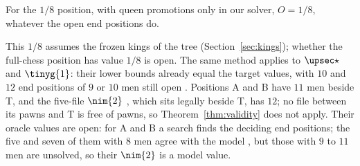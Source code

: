 \begin{proposition}\label{prop:eighth-real}
For the $1/8$ position, with queen promotions only in our solver, $O=1/8$, whatever the open end positions do.
\end{proposition}

This $1/8$ assumes the frozen kings of the tree (Section~\ref{sec:kings}); whether the full-chess position
has value $1/8$ is open. The same method applies to $\upsec\star$ and $\tinyg{1}$: their lower bounds already equal the
target values, with $10$ and $12$ end positions of $9$ or $10$ men still open . Positions A and B have $11$ men beside
T, and the five-file $\nim{2}$ , which sits legally
beside T, has $12$; no file between its pawns and T is free of pawns, so Theorem~\ref{thm:validity} does not apply. Their oracle values are open: for A and B a
search finds the deciding end positions; the five and seven of them with $8$ men agree with the model
, but those with $9$ to $11$ men are unsolved, so their $\nim{2}$ is a model value.
